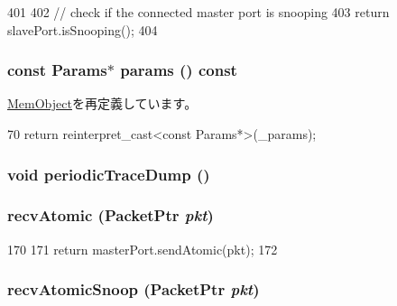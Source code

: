 \begin{DoxyCode}
401 {
402     // check if the connected master port is snooping
403     return slavePort.isSnooping();
404 }
\end{DoxyCode}
\hypertarget{classCommMonitor_acd3c3feb78ae7a8f88fe0f110a718dff}{
\subsubsection[{params}]{\setlength{\rightskip}{0pt plus 5cm}const {\bf Params}$\ast$ params () const}}
\label{classCommMonitor_acd3c3feb78ae7a8f88fe0f110a718dff}


\hyperlink{classMemObject_acd3c3feb78ae7a8f88fe0f110a718dff}{MemObject}を再定義しています。


\begin{DoxyCode}
70     { return reinterpret_cast<const Params*>(_params); }
\end{DoxyCode}
\hypertarget{classCommMonitor_a31e31032fcf23dfbf54cf733a71c87a3}{
\subsubsection[{periodicTraceDump}]{\setlength{\rightskip}{0pt plus 5cm}void periodicTraceDump ()}}
\label{classCommMonitor_a31e31032fcf23dfbf54cf733a71c87a3}
\hypertarget{classCommMonitor_a5f0b4c4a94f6b0053f9d7a4eb9c2518a}{
\subsubsection[{recvAtomic}]{ recvAtomic ({\bf PacketPtr} {\em pkt})}}
\label{classCommMonitor_a5f0b4c4a94f6b0053f9d7a4eb9c2518a}



\begin{DoxyCode}
170 {
171     return masterPort.sendAtomic(pkt);
172 }
\end{DoxyCode}
\hypertarget{classCommMonitor_a886d584c81ee4e398ff8069907f6e1a5}{
\subsubsection[{recvAtomicSnoop}]{ recvAtomicSnoop ({\bf PacketPtr} {\em pkt})}}
\label{classCommMonitor_a886d584c81ee4e398ff8069907f6e1a5}



